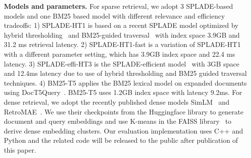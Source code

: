 {\bf Models and parameters.}
For sparse retrieval, we adopt 3 SPLADE-based  models and one BM25 based model with different relevance and efficiency  tradeoffs:
1) SPLADE-HT1 is based on   a recent SPLADE model optimized by  hybrid thresholding~\cite{2023SIGIR-Qiao}
and BM25-guided traversal~\cite{mallia2022faster,qiao2023optimizing} with index space 3.9GB
and 31.2 ms retrieval latency. 2) SPLADE-HT1-fast is a variation of SPLADE-HT1 with a different parameter setting, which has 
3.9GB index space and 22.4 ms latency. 
3) SPLADE-effi-HT3 is the SPLADE-efficient model~\cite{Lassance2022SPLADE-efficient} with 3GB space
and  12.4ms latency due to use of hybrid thresholding and BM25 guided traversal techniques. 
4) BM25-T5 applies  the BM25 lexical model on expanded documents using DocT5Query~\cite{Cheriton2019doct5query}. 
BM25-T5 uses 1.2GB index space with latency 9.2ms. 
For dense retrieval, we adopt the recently published   dense models
SimLM~\cite{Wang2022SimLM} and RetroMAE~\cite{Liu2022RetroMAE}. 
We use their   checkpoints from the Huggingface library to generate document and query embeddings 
and  use  K-means in the FAISS library~\cite{johnson2019billion} to derive dense embedding clusters.
Our evaluation implementation uses C++ and Python and the
related code will be released to the public after publication of this paper. 

